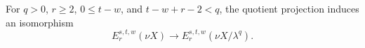 \begin{proposition}
For $q>0$, $r\ge2$, $0\le t-w$, and $t-w+r-2<q$, the quotient projection induces an isomorphism
\[E_r^{s,t,w}(\nu X)\longrightarrow E_r^{s,t,w}(\nu X/\lambda^q).\]

\end{proposition}
